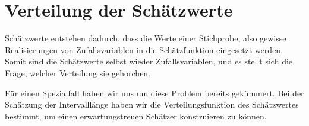 \section{Verteilung der Schätzwerte}
\label{section-verteilung-der-schaetzwerte}
Schätzwerte entstehen dadurch, dass die Werte einer Stichprobe, also
gewisse Realisierungen von Zufallsvariablen in die Schätzfunktion
eingesetzt werden.
Somit sind die Schätzwerte selbst wieder Zufallsvariablen,
und es stellt sich die Frage, welcher Verteilung sie gehorchen.

Für einen Spezialfall haben wir uns um diese Problem bereits gekümmert.
Bei der Schätzung der Intervalllänge haben wir die Verteilungsfunktion
des Schätzwertes bestimmt, um einen erwartungstreuen Schätzer konstruieren
zu können.

